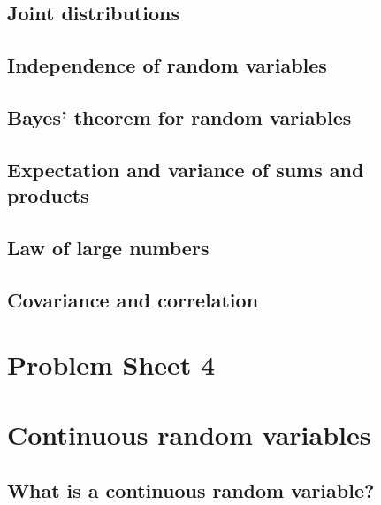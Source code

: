 \documentclass[
  a4paper,
]{book}
\theoremstyle{definition}
\theoremstyle{definition}
\theoremstyle{definition}
\theoremstyle{remark}
\begin{document}
\hypertarget{joint}{%
\section{Joint distributions}\label{joint}}

\hypertarget{independence-rv}{%
\section{Independence of random variables}\label{independence-rv}}

\hypertarget{bayes-rv}{%
\section{Bayes' theorem for random variables}\label{bayes-rv}}

\hypertarget{sum-product}{%
\section{Expectation and variance of sums and products}\label{sum-product}}

\hypertarget{lln}{%
\section{Law of large numbers}\label{lln}}

\hypertarget{covariance}{%
\section{Covariance and correlation}\label{covariance}}

\hypertarget{P4}{%
\chapter*{Problem Sheet 4}\label{P4}}

\hypertarget{S08-continuous}{%
\chapter{Continuous random variables}\label{S08-continuous}}

\hypertarget{continuous-rv}{%
\section{What is a continuous random variable?}\label{continuous-rv}}
\end{document}
